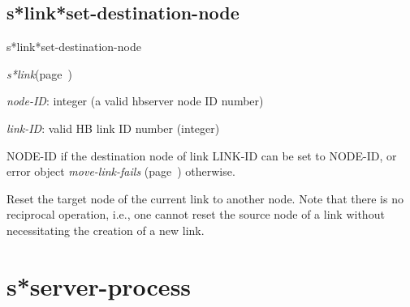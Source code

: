 \subsection{s*link*set-destination-node}
\label{s*link*set-destination-node}

\begin{description}
\item [Name:]  s*link*set-destination-node

\item [Class:]
{\sl s*link}\hfill(page~\pageref{s*link})

\item [Parameters:]
\item {\sl node-ID}:  
integer (a valid hbserver node ID number)

\item {\sl link-ID}:  
valid HB link ID number (integer)


\item [Return-value:]
NODE-ID if the destination node of link LINK-ID can be
set to NODE-ID, or error object {\sl move-link-fails} (page~\pageref{move-link-fails})
otherwise. 

\item [Description:]
Reset the target node of the current link to another
node. Note that there is no reciprocal operation,
i.e., one cannot reset the source node of a link
without necessitating the creation of a new link.

\item [Public:]



\end{description}
\horizontalline

\section{s*server-process}
\label{s*server-process}

